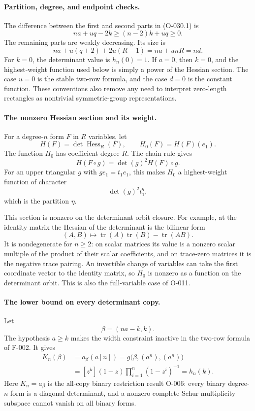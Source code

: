 \paragraph{Partition, degree, and endpoint checks.}
The difference between the first and second parts in
(O-030.1) is
\[
                 na+uq-2k\geq(n-2)k+uq\geq0.
\]
The remaining parts are weakly decreasing. Its size is
\[
 na+u(q+2)+2u(R-1)=na+unR=nd.
\]
For \(k=0\), the determinant value is \(h_n(0)=1\).
If \(a=0\), then \(k=0\), and the highest-weight function
used below is simply a power of the Hessian section.
The case \(u=0\) is the stable two-row formula, and the
case \(d=0\) is the constant function. These conventions
also remove any need to interpret zero-length rectangles
as nontrivial symmetric-group representations.

\paragraph{The nonzero Hessian section and its weight.}
For a degree-\(n\) form \(F\) in \(R\) variables, let
\[
 H(F)=\det\operatorname{Hess}_{R}(F),
 \qquad H_0(F)=H(F)(e_1).
\]
The function \(H_0\) has coefficient degree \(R\).
The chain rule gives
\[
 H(F\circ g)=\det(g)^2 H(F)\circ g.
\]
For an upper triangular \(g\) with \(ge_1=t_1e_1\), this
makes \(H_0\) a highest-weight function of character
\[
              \det(g)^2t_1^q,
\]
which is the partition \(\eta\).

This section is nonzero on the determinant orbit closure.
For example, at the identity matrix the Hessian of the
determinant is the bilinear form
\[
                  (A,B)\longmapsto
                       \operatorname{tr}(A)\operatorname{tr}(B)
                                      -\operatorname{tr}(AB).
\]
It is nondegenerate for \(n\geq2\): on scalar matrices
its value is a nonzero scalar multiple of the product
of their scalar coefficients, and on trace-zero matrices
it is the negative trace pairing. An invertible change
of variables can take the first coordinate vector to
the identity matrix, so \(H_0\) is nonzero as a function
on the determinant orbit. This is also the full-variable
case of O-011.

\paragraph{The lower bound on every determinant copy.}
Let
\[
                         \beta=(na-k,k).
\]
The hypothesis \(a\geq k\) makes the width constraint
inactive in the two-row formula of F-002. It gives
\[
 \begin{split}
 K_n(\beta)
 &=a_\beta(a[n])
   =g\bigl(\beta,(a^n),(a^n)\bigr)\\
 &=[z^k](1-z)\prod_{i=1}^{n}(1-z^i)^{-1}
   =h_n(k). 
 \end{split}                                                   \tag{O-030.5}
\]
Here \(K_n=a_\beta\) is the all-copy binary restriction
result O-006: every binary degree-\(n\) form is a
diagonal determinant, and a nonzero complete Schur
multiplicity subspace cannot vanish on all binary forms.

